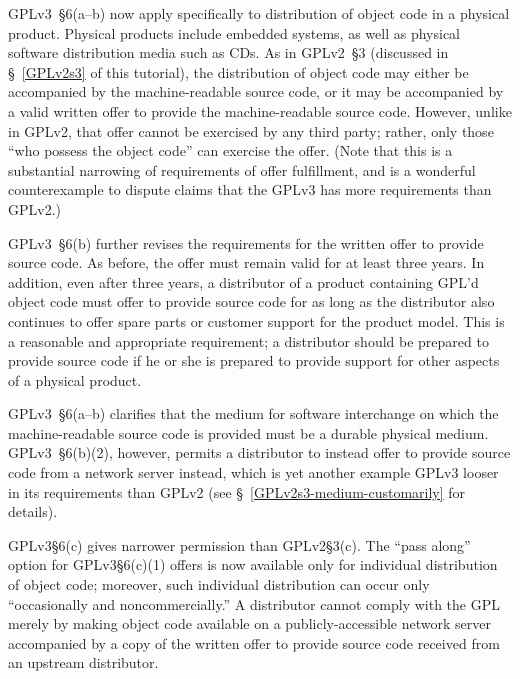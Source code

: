 
GPLv3~\S6(a--b) now apply specifically to distribution of object code in a
physical product.  Physical products include embedded systems, as well as
physical software distribution media such as CDs.  As in GPLv2~\S3 (discussed
in \S~\ref{GPLv2s3} of this tutorial), the distribution of object code may
either be accompanied by the machine-readable source code, or it may be
accompanied by a valid written offer to provide the machine-readable source
code.  However, unlike in GPLv2, that offer cannot be exercised by any third
party; rather, only those ``who possess the object code'' can exercise
the offer.  (Note that this is a substantial narrowing of requirements of
offer fulfillment, and is a wonderful counterexample to dispute claims that
the GPLv3 has more requirements than GPLv2.)


GPLv3~\S6(b) further revises the requirements for the written offer to
provide source code. As before, the offer must remain valid for at least
three years. In addition, even after three years, a distributor of a product
containing GPL'd object code must offer to provide source code for as long as
the distributor also continues to offer spare parts or customer support for
the product model.  This is a reasonable and appropriate requirement; a
distributor should be prepared to provide source code if he or she is
prepared to provide support for other aspects of a physical product.

GPLv3~\S6(a--b) clarifies that the medium for software interchange on which
the machine-readable source code is provided must be a durable physical
medium.  GPLv3~\S6(b)(2), however, permits a distributor to instead offer to
provide source code from a network server instead, which is yet another
example GPLv3 looser in its requirements than GPLv2 (see
\S~\ref{GPLv2s3-medium-customarily} for details).


GPLv3\S6(c) gives narrower permission than GPLv2\S3(c).  The ``pass along''
option for GPLv3\S6(c)(1) offers is now available only for individual
distribution of object code; moreover, such individual distribution can occur
only ``occasionally and noncommercially.''  A distributor cannot comply with
the GPL merely by making object code available on a publicly-accessible
network server accompanied by a copy of the written offer to provide source
code received from an upstream distributor.

